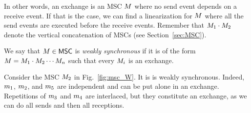 \noindent
\begin{minipage}[c]{10.5cm}

In other words, an exchange is an MSC $M$ where no send event depends on a receive event. 
If that is the case, we can find a linearization for $M$ where all the send events are executed before the 
receive events. Remember that $M_1\cdot M_2$ denote the vertical concatenation of MSCs (see 
Section~\ref{sec:MSC}).

\begin{definition}\label{def:weaksync-new}
	We say that $M \in \mathsf{MSC}$ is
	\emph{weakly synchronous} if it is of the form
	$M = M_1 \cdot M_2 \cdots M_n$
	such that every $M_i$ is an exchange.
\end{definition}

\begin{example}\label{example:msc_W}
	Consider the MSC $M_{2}$ in Fig.~\ref{fig:msc_W}. It is is weakly synchronous. Indeed, $m_1$, $m_2$, and $m_5$ are independent and can be put alone in an exchange. Repetitions of $m_3$ and $m_4$ are interlaced, but they constitute an exchange, as we can do all sends and then all receptions.
\end{example}
\end{minipage}
\hfill
